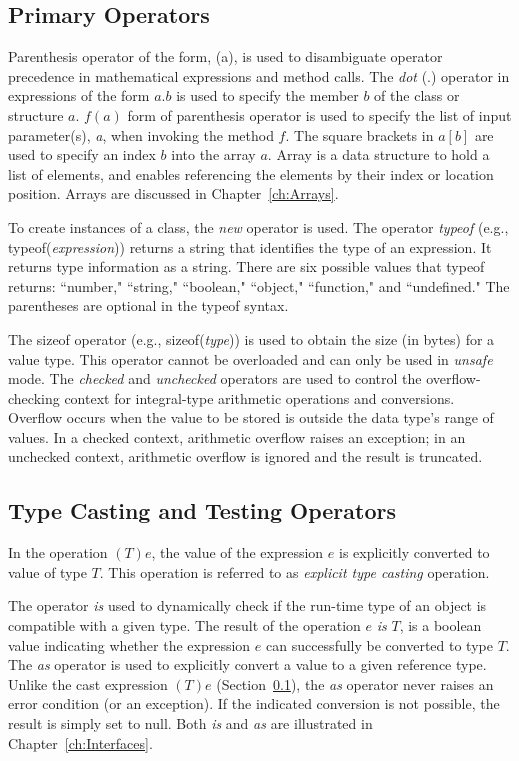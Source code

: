 \subsection{Primary Operators} \label{sec:OtherApps}

Parenthesis operator of the form, (a), is used to disambiguate
operator precedence in mathematical expressions and method calls.
The \emph{dot} (.) operator in expressions of the form $a.b$ is
used to specify the member $b$ of the class or structure $a$.
$f(a)$ form of parenthesis operator is used to specify the list of
input parameter(s), \emph{a}, when invoking the method $f$. The
square brackets in $a[b]$ are used to specify an index $b$ into
the array $a$. Array is a data structure to hold a list of
elements, and enables referencing the elements by their index or
location position. Arrays are discussed in
Chapter~\ref{ch:Arrays}.



To create instances of a class, the \emph{new} operator is used.
The operator \emph{typeof} (e.g., typeof(\emph{expression}))
returns a string that identifies the type of an expression. It
returns type information as a string. There are six possible
values that typeof returns: ``number," ``string," ``boolean,"
``object," ``function," and ``undefined." The parentheses are
optional in the typeof syntax.

The sizeof operator (e.g., sizeof(\emph{type})) is used to obtain
the size (in bytes) for a value type. This operator cannot be
overloaded and can only be used in \emph{unsafe} mode. The
\emph{checked} and \emph{unchecked} operators are used to control
the overflow-checking context for integral-type arithmetic
operations and conversions. Overflow occurs when the value to be
stored is outside the data type's range of values. In a checked
context, arithmetic overflow raises an exception; in an unchecked
context, arithmetic overflow is ignored and the result is
truncated.


\subsection{Type Casting and Testing Operators}


In the operation $(T)e$, the value of the expression $e$ is
explicitly converted to value of type $T.$ This operation is
referred to as \emph{explicit type casting} operation.

The operator \emph{is} used to dynamically check if the run-time
type of an object is compatible with a given type. The result of
the operation $e$ \emph{is} $T$, is a boolean value indicating
whether the expression $e$ can successfully be converted to type
$T$. The \emph{as} operator is used to explicitly convert a value
to a given reference type. Unlike the cast expression $(T)e$
(Section~\ref{sec:OtherApps}), the \emph{as} operator never raises
an error condition (or an exception). If the indicated conversion
is not possible, the result is simply set to null. Both \emph{is}
and \emph{as} are illustrated in Chapter~\ref{ch:Interfaces}.




